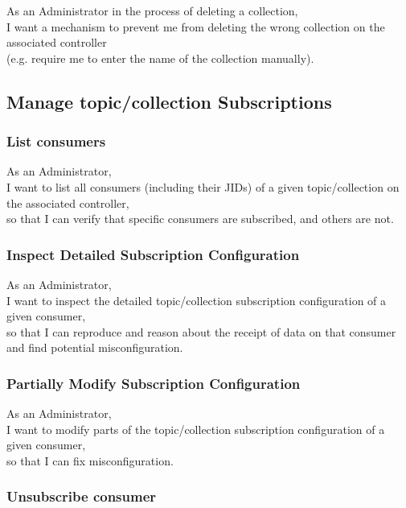 As an Administrator in the process of deleting a collection, \\
I want a mechanism to prevent me from deleting the wrong collection on the associated controller\\
(e.g. require me to enter the name of the collection manually).


\subsection{Manage topic/collection Subscriptions}\label{sec:manage-subscriptions}

\subsubsection{List consumers}

As an Administrator, \\
I want to list all consumers (including their JIDs) of a given topic/collection on the associated controller, \\
so that I can verify that specific consumers are subscribed, and others are not.


\subsubsection{Inspect Detailed Subscription Configuration}

As an Administrator, \\
I want to inspect the detailed topic/collection subscription configuration of a given consumer, \\
so that I can reproduce and reason about the receipt of data on that consumer
and find potential misconfiguration.

\subsubsection{Partially Modify Subscription Configuration}

As an Administrator, \\
I want to modify parts of the topic/collection subscription configuration of a given consumer, \\
so that I can fix misconfiguration.

\subsubsection{Unsubscribe consumer}


